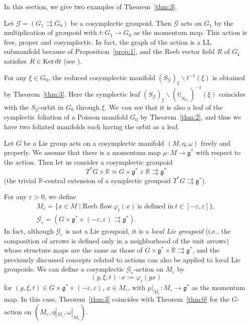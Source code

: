 \documentclass[10pt,a4paper]{amsart}
\numberwithin{equation}{section}
\begin{document}
In this section, we give two examples of Theorem~\ref{thm:3}.

\begin{Example}
 Let $\mathcal{G}=(G_1\rightrightarrows G_0)$ be a cosymplectic groupoid. Then $\mathcal{G}$ acts on $G_1$ by the multiplication of groupoid with $t\colon G_1\to G_0$ as the momentum map. This action is free, proper and cosymplectic. In fact, the graph of the action is a LL submanifold because of Proposition~\ref{prop:1}, and the Reeb vector field $R$ of $G_1$ satisfies $R\in \operatorname{Ker}{\rm d}t$ (see \cite{fernandes2023cosymplectic}).

 For any $\xi\in G_0$, the reduced cosymplectic manifold $(S_{\mathcal{G}})_\xi\backslash t^{-1}(\xi)$ is obtained by Theorem~\ref{thm:3}. Here the symplectic leaf $(S_{\mathcal{G}})_\xi\backslash (t|_{S_{G_1}})^{-1}(\xi)$ coincides with the $S_\mathcal{G}$-orbit in $G_0$ through $\xi$. We~can see that it is also a leaf of the symplectic foliation of a Poisson manifold $G_0$ by Theorem~\ref{thm:2}, and thus we have two foliated manifolds each having the orbit as a leaf.
\end{Example}

\begin{Example}
 Let $G$ be a Lie group acts on a cosymplectic manifold $(M,\eta,\omega)$ freely and properly. We assume that there is a momentum map $\mu\colon M\to\mathfrak{g}^\ast$ with respect to the action. Then let us consider a cosymplectic groupoid
 \[T^\ast G\times\mathbb{R}\simeq G\times\mathfrak{g}^\ast\times\mathbb{R}\rightrightarrows\mathfrak{g}^\ast\]
 (the trivial $\mathbb{R}$-central extension of a symplectic groupoid $T^\ast G\rightrightarrows\mathfrak{g}^\ast$).

 For any $\varepsilon>0$, we define
 \begin{gather*}
 M_\varepsilon=\{x\in M \mid \text{Reeb flow}\ \varphi_t(x)\ \text{is defined in}\ t\in[-\varepsilon,\varepsilon] \},\\
 \mathcal{G}_\varepsilon=(G\times\mathfrak{g}^\ast\times(-\varepsilon,\varepsilon)\rightrightarrows\mathfrak{g}^\ast).
 \end{gather*}
 In fact, although $\mathcal{G}_\varepsilon$ is not a Lie groupoid, it is a \textit{local Lie groupoid} (i.e., the composition of arrows is defined only in a neighborhood of the unit arrows) whose structure maps are the same as those of $G\times\mathfrak{g}^\ast\times\mathbb{R}\rightrightarrows\mathfrak{g}^\ast$, and the previously discussed concepts related to actions can also be applied to local Lie groupoids. We can define a cosymplectic $\mathcal{G}_\varepsilon$-action on $M_\varepsilon$ by
 \[(g,\xi,t)\cdot x:=\varphi_t(gx)\]
 for $(g,\xi,t)\in G\times\mathfrak{g}^\ast\times(-\varepsilon,\varepsilon)$, $ x\in M_\varepsilon$, with $\mu|_{M_\varepsilon}\colon M_\varepsilon\to\mathfrak{g}^\ast$ as the momentum map. In this case, Theorem~\ref{thm:3} coincides with Theorem~\ref{thm:0} for the $G$-action on $(M_\varepsilon,\eta|_{M_\varepsilon},\omega|_{M_\varepsilon})$.
\end{Example}
\end{document}
